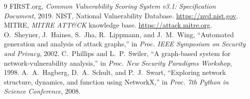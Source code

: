 \documentclass[11pt]{article}
\begin{document}
\begin{thebibliography}{9}
 FIRST.org, \emph{Common Vulnerability Scoring System v3.1: Specification Document}, 2019.
 NIST, National Vulnerability Database. \url{https://nvd.nist.gov}.
 MITRE, \emph{MITRE ATT\&CK} knowledge base. \url{https://attack.mitre.org}.
 O.~Sheyner, J.~Haines, S.~Jha, R.~Lippmann, and J.~M.~Wing, ``Automated generation and analysis of attack graphs,'' in \emph{Proc. IEEE Symposium on Security and Privacy}, 2002.
 C.~Phillips and L.~P.~Swiler, ``A graph-based system for network-vulnerability analysis,'' in \emph{Proc. New Security Paradigms Workshop}, 1998.
 A.~A.~Hagberg, D.~A.~Schult, and P.~J.~Swart, ``Exploring network structure, dynamics, and function using NetworkX,'' in \emph{Proc. 7th Python in Science Conference}, 2008.
\end{thebibliography}
\end{document}
